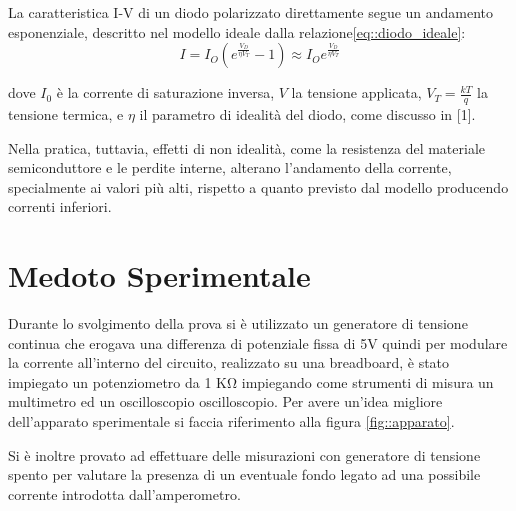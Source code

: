 \documentclass[a4paper,11pt]{article}
\begin{document}
La caratteristica I-V di un diodo polarizzato direttamente segue un andamento esponenziale, descritto nel modello ideale dalla relazione\eqref{eq::diodo_ideale}:
\begin{equation}
\label{eq::diodo_ideale}
I=I_O(e^{\frac{V_D}{\eta V_T}}-1) \approx  I_O e^{\frac{V_D}{\eta V_T}}
\end{equation}

dove $I_0$ è la corrente di saturazione inversa, $V$ la tensione applicata, $V_T = \frac{kT}{q}$ la tensione termica, e $\eta$ il parametro di idealità del diodo, come discusso in [1].

Nella pratica, tuttavia, effetti di non idealità, come la resistenza del materiale semiconduttore e le perdite interne, alterano l'andamento della corrente, specialmente ai valori più alti, rispetto a quanto previsto dal modello  producendo correnti inferiori.
	
\section{Medoto Sperimentale}
Durante lo svolgimento della prova si è utilizzato un generatore di tensione continua che erogava una differenza di potenziale fissa di 5V quindi per modulare la corrente all'interno del circuito, realizzato su una breadboard, è stato impiegato un potenziometro da 1 $\mathrm{ K\Omega}$ impiegando come strumenti di misura un multimetro ed un oscilloscopio oscilloscopio. Per avere un'idea migliore dell'apparato sperimentale si faccia riferimento alla figura \ref{fig::apparato}. 

Si è inoltre provato ad effettuare delle misurazioni con generatore di tensione spento per valutare la presenza di un eventuale fondo legato ad una possibile corrente introdotta dall'amperometro.
\end{document}
